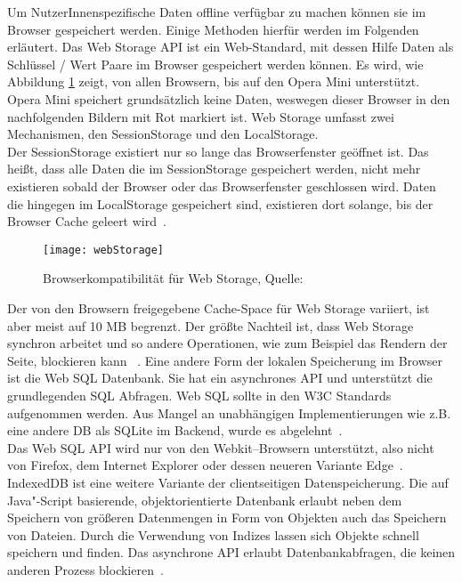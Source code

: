 Um NutzerInnenspezifische Daten offline verfügbar zu machen können sie im Browser gespeichert werden. Einige Methoden hierfür werden im Folgenden erläutert.
%
Das Web Storage \gls{API} ist ein Web-Standard, mit dessen Hilfe Daten als Schlüssel / Wert Paare im Browser gespeichert werden können. Es wird, wie Abbildung \ref{fig:webStorage} zeigt, von allen Browsern, bis auf den Opera Mini unterstützt. Opera Mini speichert grundsätzlich keine Daten, weswegen dieser Browser in den nachfolgenden Bildern mit Rot markiert ist.
Web Storage umfasst zwei Mechanismen, den SessionStorage und den LocalStorage.\\
Der SessionStorage existiert nur so lange das Browserfenster geöffnet ist.
Das heißt, dass alle Daten die im SessionStorage gespeichert werden, nicht mehr existieren sobald der Browser oder das Browserfenster geschlossen wird.
Daten die hingegen im LocalStorage gespeichert sind, existieren dort solange, bis der Browser Cache geleert wird~\cite{webstorage}.
\begin{figure}[H]
	\centering
	\texttt{[image: webStorage]}
	\grayRule
	\caption[Browserkompatibilität für Web Storage]{Browserkompatibilität für Web Storage, Quelle: ~\cite{caniuse-ws}}
	\label{fig:webStorage}
\end{figure}
Der von den Browsern freigegebene Cache-Space für Web Storage variiert, ist aber meist auf 10 MB begrenzt.
Der größte Nachteil ist, dass Web Storage synchron arbeitet und so andere Operationen, wie zum Beispiel das Rendern der Seite, blockieren kann ~\cite{webstorage-con}.
%
%
Eine andere Form der lokalen Speicherung im Browser ist die Web SQL Datenbank.
Sie hat ein asynchrones \gls{API} und unterstützt die grundlegenden SQL Abfragen. Web SQL sollte in den W3C Standards aufgenommen werden. Aus Mangel an unabhängigen Implementierungen wie z.B. eine andere \gls{DB} als SQLite im Backend, wurde es abgelehnt~\cite{websql}.\\
Das Web SQL \gls{API} wird nur von den Webkit--Browsern unterstützt, also nicht von Firefox, dem Internet Explorer oder dessen neueren Variante Edge~\cite{caniuse-websql}.
%
%
IndexedDB ist eine weitere Variante der clientseitigen Datenspeicherung. Die auf Java"-Script basierende, objektorientierte Datenbank erlaubt neben dem Speichern von größeren Datenmengen in Form von Objekten auch das Speichern von Dateien. Durch die Verwendung von Indizes lassen sich Objekte schnell speichern und finden. Das asynchrone \gls{API} erlaubt Datenbankabfragen, die keinen anderen Prozess blockieren~\cite{idb}.
